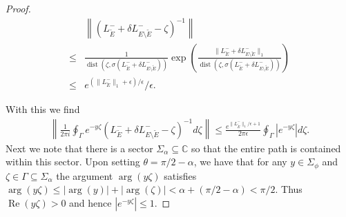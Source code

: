 \documentclass[reqno,12pt,letterpaper]{amsart}
\numberwithin{equation}{section}
\newcommand{\Lin}{L^{-}}
\newcommand{\dist}{{\operatorname{dist}}}
\renewcommand{\Re}{\operatorname{Re}}
\newcommand{\1}{\mathds{1}}
\theoremstyle{definition}
\begin{document}
\begin{proof}
\begin{minipage}[b]{0.7\textwidth}
\begin{align}
&\left\| (  \Lin_{\tilde{E}} + \delta \Lin_{E\setminus \tilde{E}}     - \zeta)^{-1} \right\| \\
	\leq& 
	\frac{1}{\dist(\zeta, \sigma(\Lin_{\tilde{E}} + \delta \Lin_{E\setminus \tilde{E}}))} \exp\left(  \frac{\|\Lin_{\tilde{E}} + \delta \Lin_{E\setminus \tilde{E}}\|_1}{\dist(\zeta, \sigma(\Lin_{\tilde{E}} + \delta \Lin_{E\setminus \tilde{E}}))} \right)\\
	\leq&
	e^{(\|\Lin_{\tilde{E}}\|_1 + \epsilon)/\epsilon}/\epsilon.
\end{align}

With this we find
\begin{align}
	\left\| \frac{1}{2 \pi i}\oint_\Gamma e^{-y\zeta}\left(\Lin_{\tilde{E}} + \delta \Lin_{E\setminus \tilde{E}} - \zeta\right)^{-1} d\zeta\right\|
	\leq 
	\frac{e^{\|\Lin_{\tilde{E}}\|_1/\epsilon + 1}}{2\pi \epsilon} \oint_\Gamma |e^{-y\zeta}|d\zeta.
\end{align}
	Next we note that there is a sector $\Sigma_\alpha \subseteq \mathds{C}$ so that the entire path is contained within this sector. Upon setting $\theta = \pi/2 - \alpha $, we have that for any $y \in \Sigma_\phi$ and $\zeta \in \Gamma \subseteq \Sigma_\alpha$ the argument $\arg(y\zeta)$ satisfies $\arg(y\zeta) \leq |\arg(y)| + |\arg(\zeta)| < \alpha + (\pi/2 - \alpha) < \pi/2 $. Thus $\Re(y\zeta) > 0$ and hence $|e^{-y\zeta}| \leq 1$. 
	\end{minipage}
	\begin{minipage}[b]{0.4\textwidth}
		\centering

\end{minipage}
\end{proof}
\end{document}
